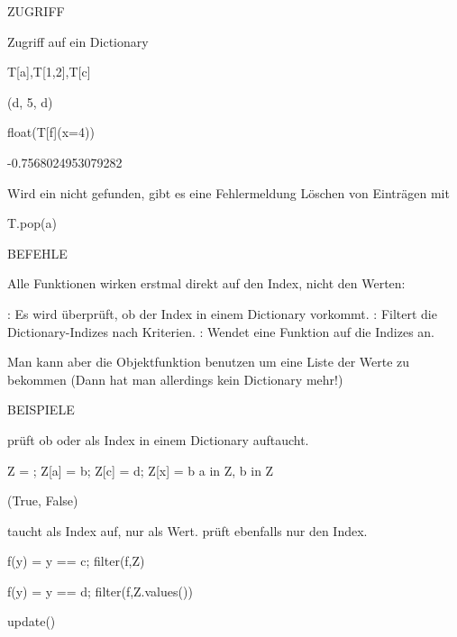 \documentclass[fontsize=12pt,paper=a4,twoside,bibtotoc,idxtotoc,
liststotoc,pagesize,BCOR1.2cm,DIV15,chapterprefix,pagesize=pdftex]{scrbook}
\theoremstyle{plain}
\theoremstyle{definition}
\theoremstyle{remark}
\begin{document}
ZUGRIFF


 Zugriff auf ein Dictionary
\begin{sagein}
T[a],T[1,2],T[c]
\end{sagein}
\begin{sage}
(d, 5, d)
\end{sage}
\begin{sagein}
 float(T[f](x=4))
\end{sagein}
\begin{sage}
 -0.7568024953079282
\end{sage}
Wird ein  nicht gefunden, gibt es eine Fehlermeldung
 Löschen von Einträgen mit 
\begin{sagein}
T.pop(a)
\end{sagein}


BEFEHLE

Alle Funktionen wirken erstmal direkt auf den Index, nicht den Werten:

 : Es wird überprüft, ob der Index  in einem
Dictionary vorkommt. 
 : Filtert die Dictionary-Indizes nach Kriterien.
 : Wendet eine Funktion auf die Indizes an.

Man kann aber die Objektfunktion  benutzen um eine Liste der Werte zu bekommen (Dann hat man allerdings kein Dictionary mehr!)

BEISPIELE


   prüft ob  oder  als Index in einem Dictionary auftaucht.
\begin{sagein}
Z = {}; Z[a] = b; Z[c] = d; Z[x] = b
a in Z, b in Z
\end{sagein}
\begin{sage}
(True, False)
\end{sage}
 taucht als Index auf,  nur als Wert.
  prüft ebenfalls nur den Index.
\begin{sagein}
f(y) = y == c; filter(f,Z)
\end{sagein}
\begin{sage}
[c]
\end{sage}

\begin{sagein}
f(y) = y == d; filter(f,Z.values())
\end{sagein}
\begin{sage}
[d]
\end{sage}



update()
\end{document}
